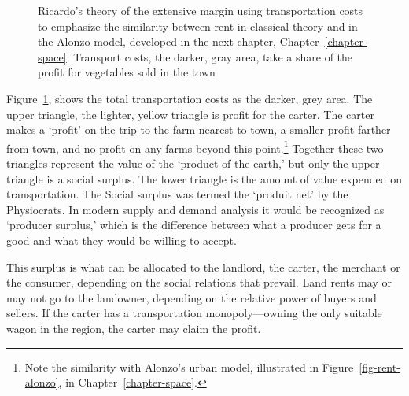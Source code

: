 \begin{figure}[htb]
\begin{center}
    
\caption[Ricardo's theory of extensive margin.]{Ricardo's theory of the extensive margin using transportation costs to emphasize the similarity between rent in classical theory and in the Alonzo model, developed in the next chapter, Chapter~\ref{chapter-space}. Transport costs, the darker, gray area, take a share of the profit for vegetables sold in the town}
\label{fig-rent-ricardo}
\end{center}
\end{figure}


Figure~\ref{fig-rent-ricardo}, shows the total transportation costs as the darker, grey area. The upper triangle,  the lighter,  yellow triangle is profit for the carter. The carter makes a `profit' on the trip to the farm nearest to town, a smaller profit farther from town, and no profit on any farms beyond this point.\footnote{Note the similarity with Alonzo's urban model, illustrated in Figure~\ref{fig-rent-alonzo}, in Chapter~\ref{chapter-space}.} 
Together these two triangles represent the  value of the `product of the earth,' but only the upper triangle is a social \gls{surplus}. The lower triangle is the amount of value expended on transportation. The Social surplus  was termed the `\gls{produit net}' by the Physiocrats. In modern supply and demand analysis it would be recognized as `\gls{producer surplus},' which is the difference between what a producer gets for a good and what they would be willing to accept. 

This surplus is what can be allocated to the landlord, the carter, the merchant or the consumer, depending on the social relations that prevail. 
Land rents may or may not go to the landowner, depending on the relative power of buyers and sellers. If the carter has a transportation monopoly---owning the only suitable wagon in the region, the carter may claim the profit. 

